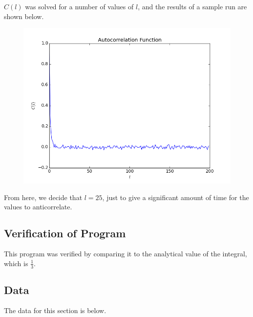 \documentclass[10pt,letter]{article}
\begin{document}
$C(l)$ was solved for a number of values of $l$, and the results of a sample run are shown below.

\begin{figure}[H]
  \centering
    \includegraphics[width=.6\textwidth]{homework7_problem2_plot0}
\end{figure}

From here, we decide that $l=25$, just to give a significant amount of time for the values to anticorrelate.

\subsection{Verification of Program}

This program was verified by comparing it to the analytical value of the integral, which is $\frac{1}{3}$.

\subsection{Data}

The data for this section is below.
\end{document}
